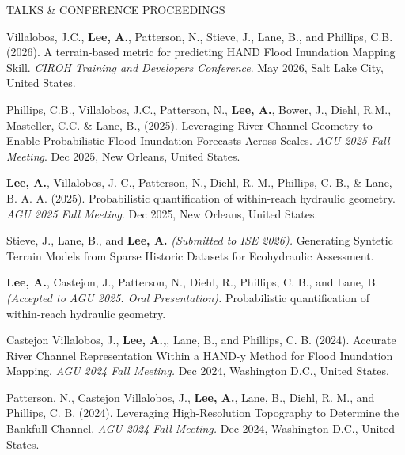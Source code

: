 \documentclass{resume_anzy} %
\begin{document}
\begin{rSection}{TALKS \& CONFERENCE PROCEEDINGS}
\vspace{-2.5mm}

\item [1] Villalobos, J.C., \textbf{Lee, A.}, Patterson, N., Stieve, J., Lane, B., and Phillips, C.B. (2026). A terrain-based metric for predicting HAND Flood Inundation Mapping Skill. \textit{CIROH Training and Developers Conference}. May 2026, Salt Lake City, United States.

\item [2] Phillips, C.B., Villalobos, J.C., Patterson, N., \textbf{Lee, A.}, Bower, J., Diehl, R.M., Masteller, C.C. \& Lane, B., (2025). Leveraging River Channel Geometry to Enable Probabilistic Flood Inundation Forecasts Across Scales. \textit{AGU 2025 Fall Meeting}. Dec 2025, New Orleans, United States.


\item [3] \textbf{Lee, A.}, Villalobos, J. C., Patterson, N., Diehl, R. M., Phillips, C. B., \& Lane, B. A. A. (2025). Probabilistic quantification of within-reach hydraulic geometry. \textit{AGU 2025 Fall Meeting}. Dec 2025, New Orleans, United States. 


\item [4] Stieve, J., Lane, B., and \textbf{Lee, A.} \textit{(Submitted to ISE 2026).} Generating Syntetic Terrain Models from Sparse Historic Datasets for Ecohydraulic Assessment. 

\item [5] \textbf{Lee, A.}, Castejon, J., Patterson, N., Diehl, R., Phillips, C. B., and Lane, B. \textit{(Accepted to AGU 2025. Oral Presentation).} Probabilistic quantification of within-reach hydraulic geometry. 

\item [6] Castejon Villalobos, J., \textbf{Lee, A.,}, Lane, B., and Phillips, C. B.  (2024). Accurate River Channel Representation Within a HAND-y Method for Flood Inundation Mapping. \textit{AGU 2024 Fall Meeting.} Dec 2024, Washington D.C., United States.

\item [7] Patterson, N., Castejon Villalobos, J., \textbf{Lee, A.}, Lane, B., Diehl, R. M., and Phillips, C. B. (2024). Leveraging High-Resolution Topography to Determine the Bankfull Channel. \textit{AGU 2024 Fall Meeting.} Dec 2024, Washington D.C., United States.


\end{rSection}
\end{document}

